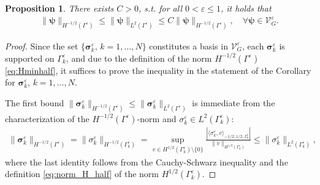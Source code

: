 \documentclass[]{article}
\newtheorem{proposition}{Proposition}
\numberwithin{equation}{section}
\numberwithin{theorem}{section}
\numberwithin{lemma}{section}
\numberwithin{corollary}{section}
\numberwithin{proposition}{section}
\numberwithin{definition}{section}
\newcommand{\re}{\varepsilon}
\renewcommand{\vec}{\boldsymbol}
\begin{document}
\begin{appendices}
		\begin{proposition}
			\label{prop:L^2_H_minus_half_mbound_proof}
			There exists $C>0$, s.t. for all $0<\re\leq 1$, it holds that
			\begin{align*}%
				\|\vec{\psi} \|_{H^{-1/2}(\Gamma^{\re})}\leq 	\|\vec{\psi}  \|_{L^2(\Gamma^{\re})} \leq C \|\vec{\psi} \|_{H^{-1/2}(\Gamma^{\re})}, \quad \forall \vec{\psi}\in \mathcal{V}_G^{\re}.
			\end{align*}
		\end{proposition}
		\begin{proof}
			\label{proof:L^2_H_minus_half_mbound}
			Since the set $\{\vec{\sigma}_k^{\re}, \, k=1,\ldots,N\}$ constitutes a basis in $\mathcal{V}_G^{\re}$, each $\vec{\sigma}_k^{\re}$ is supported on $\Gamma_k^{\re}$, and due to the definition of the norm $H^{-1/2}(\Gamma^{\re})$ \eqref{eq:Hminhalf}, it suffices to prove the inequality in the statement of the Corollary for $\vec{\sigma}_k^{\re}$, $k=1,\ldots, N$. 
			
			The first bound $\|\vec{\sigma}_k^{\re} \|_{H^{-1/2}(\Gamma^{\re})}\leq 	\|\vec{\sigma}_k^{\re}  \|_{L^2(\Gamma^{\re})}$ is immediate from the characterization of the $H^{-1/2}(\Gamma^{\re})$-norm and $\sigma_k^{\re}\in L^2(\Gamma_k^{\re})$:
			\begin{align*}%
				\|\vec{\sigma}_k^{\re} \|_{H^{-1/2}(\Gamma^{\re})}=\|\sigma_k^{\re}\|_{H^{-1/2}(\Gamma^{\re}_k)}=\sup\limits_{v\in H^{1/2}(\Gamma_k^{\re}) \setminus \{0\}}\frac{|\langle \sigma_k^{\re}, v\rangle_{-1/2, 1/2, \Gamma^{\re}_k}|}{\|v\|_{H^{1/2}(\Gamma^{\re}_k)}}\leq \|\sigma_k^{\re}\|_{L^2(\Gamma_k^{\re})},
			\end{align*}
			where the last identity follows from the Cauchy-Schwarz inequality and the definition \eqref{eq:norm_H_half} of the norm $H^{1/2}(\Gamma^{\re}_k)$.
			

\end{proof}
\end{appendices}
\end{document}
